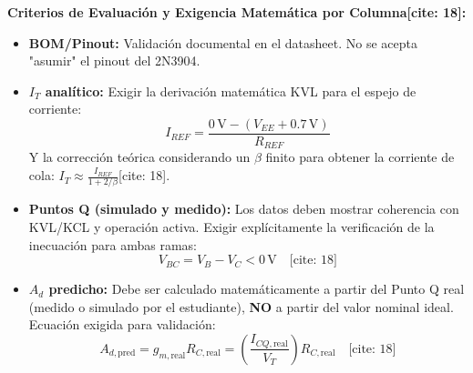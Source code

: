 \documentclass[10pt, a4paper, landscape]{article}
\begin{document}
\vspace{0.8cm}
\textbf{Criterios de Evaluación y Exigencia Matemática por Columna[cite: 18]:}
\begin{itemize}
    \item \textbf{BOM/Pinout:} Validación documental en el datasheet. No se acepta "asumir" el pinout del 2N3904.
    \item \textbf{$I_T$ analítico:} Exigir la derivación matemática KVL para el espejo de corriente: 
    \begin{equation*}
        I_{REF} = \frac{0\,\text{V} - (V_{EE} + 0.7\,\text{V})}{R_{REF}}
    \end{equation*}
    Y la corrección teórica considerando un $\beta$ finito para obtener la corriente de cola: $I_T \approx \frac{I_{REF}}{1+2/\beta}$[cite: 18].
    \item \textbf{Puntos Q (simulado y medido):} Los datos deben mostrar coherencia con KVL/KCL y operación activa. Exigir explícitamente la verificación de la inecuación para ambas ramas: 
    \begin{equation*}
        V_{BC} = V_B - V_C < 0\,\text{V} \quad \text{[cite: 18]}
    \end{equation*}
    \item \textbf{$A_d$ predicho:} Debe ser calculado matemáticamente a partir del Punto Q real (medido o simulado por el estudiante), \textbf{NO} a partir del valor nominal ideal. Ecuación exigida para validación: 
    \begin{equation*}
        A_{d,\text{pred}} = g_{m,\text{real}} R_{C,\text{real}} = \left(\frac{I_{CQ,\text{real}}}{V_T}\right) R_{C,\text{real}} \quad \text{[cite: 18]}
    \end{equation*}
\end{itemize}
\end{document}
